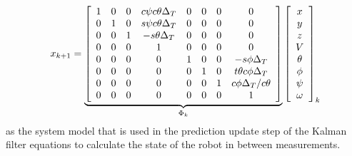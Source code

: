 \begin{align*}
x_{k+1} = 
\underbrace{\left[\begin{array}{c c c c c c c c}
1 & 0 & 0 & c\psi c\theta \Delta_T & 0 & 0 & 0 & 0 \\
0 & 1 & 0 & s\psi c\theta \Delta_T & 0 & 0 & 0 & 0\\
0 & 0 & 1 & -s\theta \Delta_T & 0 & 0 & 0 & 0\\
0 & 0 & 0 & 1 & 0 & 0 & 0 & 0 \\
0 & 0 & 0 & 0 & 1 & 0 & 0 & -s\phi \Delta_T \\
0 & 0 & 0 & 0 & 0 & 1 & 0 & t\theta c\phi \Delta_T \\
0 & 0 & 0 & 0 & 0 & 0 & 1 & c\phi \Delta_T/c\theta \\
0 & 0 & 0 & 0 & 0 & 0 & 0 & 1
\end{array}\right]}_{\Phi_k}
\left[\begin{array}{c}
x \\ y \\ z \\ V \\ \theta \\ \phi \\ \psi \\ \omega
\end{array}\right]_k
\end{align*}
as the system model that is used in the prediction update step of the Kalman filter equations to calculate the state of the robot in between measurements.


